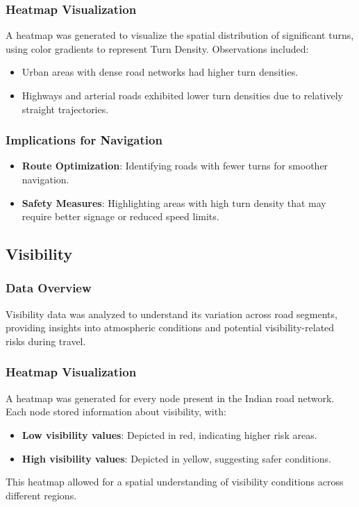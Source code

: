 \documentclass[sigplan,screen]{acmart}
\begin{document}
\subsubsection{Heatmap Visualization}
A heatmap was generated to visualize the spatial distribution of significant turns, using color gradients to represent Turn Density. Observations included:
\begin{itemize}
    \item Urban areas with dense road networks had higher turn densities.
    \item Highways and arterial roads exhibited lower turn densities due to relatively straight trajectories.
\end{itemize}

\subsubsection{Implications for Navigation}
\begin{itemize}
    \item \textbf{Route Optimization}: Identifying roads with fewer turns for smoother navigation.
    \item \textbf{Safety Measures}: Highlighting areas with high turn density that may require better signage or reduced speed limits.
\end{itemize}

\subsection{Visibility}
\subsubsection{Data Overview}
Visibility data was analyzed to understand its variation across road segments, providing insights into atmospheric conditions and potential visibility-related risks during travel.

\subsubsection{Heatmap Visualization}
A heatmap was generated for every node present in the Indian road network. Each node stored information about visibility, with:
\begin{itemize}
    \item \textbf{Low visibility values}: Depicted in red, indicating higher risk areas.
    \item \textbf{High visibility values}: Depicted in yellow, suggesting safer conditions.
\end{itemize}
This heatmap allowed for a spatial understanding of visibility conditions across different regions.
\end{document}
